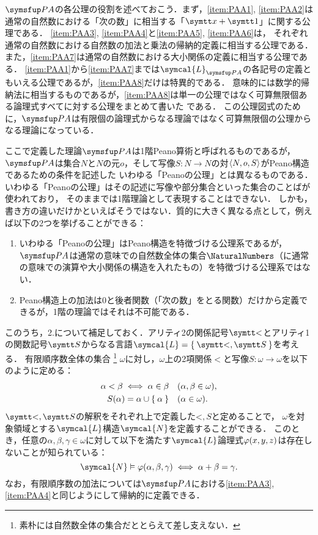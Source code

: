 \(\PA\)の各公理の役割を述べておこう．まず，\cref{item:PAA1}, \cref{item:PAA2}は通常の自然数における「次の数」に相当する「\(\obj{x} + \obj{1}\)」に関する公理である．
\cref{item:PAA3}, \cref{item:PAA4}と\cref{item:PAA5}, \cref{item:PAA6}は，
それぞれ通常の自然数における自然数の加法と乗法の帰納的定義に相当する公理である．
また，\cref{item:PAA7}は通常の自然数における大小関係の定義に相当する公理である．
\cref{item:PAA1}から\cref{item:PAA7}までは\(\symcal{L}_{\PA}\)の各記号の定義ともいえる公理であるが，\cref{item:PAA8}だけは特異的である．
意味的には数学的帰納法に相当するものであるが，\cref{item:PAA8}は単一の公理ではなく可算無限個ある論理式すべてに対する公理をまとめて書いた%
%
である．
この公理図式のために，\(\PA\)は有限個の論理式からなる理論ではなく可算無限個の公理からなる理論になっている．

\begin{Note}
	ここで定義した理論\(\PA\)は1階Peano算術と呼ばれるものであるが，
	\(\PA\)は集合\(N\)と\(N\)の元\(o\)，そして写像\(S \colon N \to N\)の対\(\langle N, o, S \rangle\)がPeano構造であるための条件を記述した
	いわゆる「Peanoの公理」とは異なるものである．
	いわゆる「Peanoの公理」はその記述に写像や部分集合といった集合のことばが使われており，
	そのままでは1階理論として表現することはできない．
	しかも，書き方の違いだけかといえばそうではない．質的に大きく異なる点として，例えば以下の2つを挙げることができる：
	\begin{enumerate}
		\item いわゆる「Peanoの公理」はPeano構造を特徴づける公理系であるが，
		      \(\PA\)は通常の意味での自然数全体の集合\(\NaturalNumbers\)（に通常の意味での演算や大小関係の構造を入れたもの）を特徴づける公理系ではない．
		\item Peano構造上の加法は0と後者関数（「次の数」をとる関数）だけから定義できるが，1階の理論ではそれは不可能である．
	\end{enumerate}

	このうち，2.について補足しておく．アリティ2の関係記号\(\obj{<}\)とアリティ1の関数記号\(\obj{S}\)からなる言語\(\symcal{L} = \Set{\obj{<}, \obj{S}}\)を考える．
	有限順序数全体の集合%
	\footnote{%
		素朴には自然数全体の集合だととらえて差し支えない．%
	}%
	\(\omega\)に対し，\(\omega\)上の2項関係\(<\)と写像\(S \colon \omega \to \omega\)を以下のように定める：
	\begin{align*}
		\alpha < \beta \metaequivalent \alpha \in \beta \quad & (\alpha, \beta \in \omega), \\
		\apply{S}{\alpha} = \alpha \cup \Set{\alpha} \quad    & (\alpha \in \omega).
	\end{align*}
	\(\obj{<}, \obj{S}\)の解釈をそれぞれ上で定義した\(\mathord{<}, S\)と定めることで，
	\(\omega\)を対象領域とする\(\symcal{L}\)構造\(\symcal{N}\)を定義することができる．
	このとき，任意の\(\alpha, \beta, \gamma \in \omega\)に対して以下を満たす\(\symcal{L}\)論理式\(\apply{\varphi}{x, y, z}\)は存在しないことが知られている：
	\[
		\symcal{N} \satisfy \apply{\varphi}{\alpha, \beta, \gamma} \metaequivalent \alpha + \beta = \gamma.
	\]
	なお，有限順序数の加法については\(\PA\)における\cref{item:PAA3}, \cref{item:PAA4}と同じようにして帰納的に定義できる．
\end{Note}

